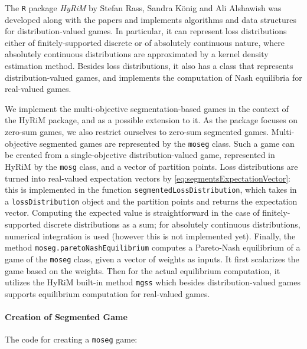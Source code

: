 \documentclass[a4paper]{scrreprt}
\begin{document}
    The \texttt{R} package \emph{HyRiM}  by Stefan Rass, Sandra König and Ali Alshawish was developed along with the papers \cite{bib:rassGameRiskManagI,bib:rassGameRiskManagII,bib:rassGameRiskManagIII} and implements algorithms and data structures for distribution-valued games.
    In particular, it can represent loss distributions either of finitely-supported discrete or of absolutely continuous nature, where absolutely continuous distributions are approximated by a kernel density estimation method. Besides loss distributions, it also has a class that represents distribution-valued games, and implements the computation of Nash equilibria for real-valued games.
    
    We implement the multi-objective segmentation-based games in the context of the HyRiM package, and as a possible extension to it. As the package focuses on zero-sum games, we also restrict ourselves to zero-sum segmented games.
    Multi-objective segmented games are represented by the \texttt{moseg} class. Such a game can be created from a single-objective distribution-valued game, represented in HyRiM by the \texttt{mosg} class, and a vector of partition points.
    Loss distributions are turned into real-valued expectation vectors by \eqref{eq:segmentsExpectationVector}: this is implemented in the function \texttt{segmentedLossDistribution}, which takes in a \texttt{lossDistribution} object and the partition points and returns the expectation vector.
    Computing the expected value is straightforward in the case of finitely-supported discrete distributions as a sum; for absolutely continuous distributions, numerical integration is used 
    (however this is not implemented yet).
    Finally, the method \texttt{moseg.paretoNashEquilibrium} computes a Pareto-Nash equilibrium of a game of the \texttt{moseg} class, given a vector of weights as inputs.
    It first scalarizes the game based on the weights.
    Then for the actual equilibrium computation, it utilizes the HyRiM built-in method \texttt{mgss} which besides distribution-valued games supports equilibrium computation for real-valued games.
    
    \paragraph{Creation of Segmented Game}
    The code for creating a \texttt{moseg} game:
    
    
    
\end{document}
